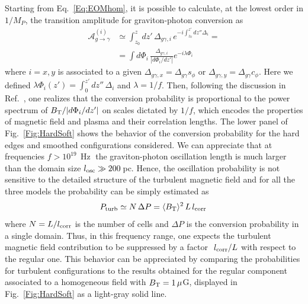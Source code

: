 \documentclass[twocolumn,superscriptaddress,floatfix,preprintnumbers, nofootinbib,hyperref]{revtex4-2}
\DeclareMathOperator{\Hz}{Hz}
\begin{document}
Starting from Eq.~\eqref{Eq:EOMhom}, it is possible to calculate, at the lowest order in $1/M_{P}$, the transition amplitude for graviton-photon conversion as~\cite{Marsh:2021ajy}
\begin{equation}
    \begin{split}
\mathcal{A}^{(i)}_{g\to\gamma}&\simeq \int_{z_{0}}^{z}dz'\, \Delta_{g\gamma,i}\,e^{-i\int_{z_{0}}^{z'} dz''\Delta_{i}}=\\
&=\int d\Phi_{i}\, \frac{\Delta_{g\gamma,i}}{|d\Phi_{i}/dz'|}e^{-i\lambda \Phi_{i}}
\end{split}
\end{equation}
where $i=x,y$ is associated to a given $\Delta_{g\gamma,x}=\Delta_{g\gamma}s_{\phi}$ or $\Delta_{g\gamma,y}=\Delta_{g\gamma}c_{\phi}$. Here we defined $\lambda\Phi_{i}(z')=\int_{0}^{z'}dz''\,\Delta_{i}$ and $\lambda=1/f$. Then, following the discussion in Ref.~\cite{Marsh:2021ajy}, one realizes that the conversion probability is proportional to the power spectrum of $B_{\rm T}/|d\Phi_{i}/dz'|$ on scales dictated by $1/f$, which encodes the properties of magnetic field and plasma and their correlation lengths. The lower panel of Fig.~\ref{Fig:HardSoft} shows the behavior of the conversion probability for the hard edges and smoothed configurations considered. We can appreciate that at frequencies $f>10^{19}\,\Hz$ the graviton-photon oscillation length is much larger than the domain size $l_{\rm osc}\gg 200\,$pc. Hence, the oscillation probability is not sensitive to the detailed structure of the turbulent magnetic field and for all the three models the probability can be simply estimated as~\cite{Carenza:2021alz}
\begin{equation}
    P_{\rm turb}\simeq N\,\Delta P=\langle B_{\rm T}\rangle^2\,L\,l_{\rm corr}\,
\end{equation}
where $N=L/l_{\rm corr}$ is the number of cells and $\Delta P$ is the conversion probability in a single domain. Thus, in this frequency range, one expects the turbulent magnetic field contribution to be suppressed by a factor $~l_{\rm corr}/L$ with respect to the regular one. This behavior can be appreciated by comparing the probabilities for turbulent configurations to the results obtained for the regular component associated to a homogeneous field with $B_{\rm T}=1\,\mu$G, displayed in Fig.~\ref{Fig:HardSoft} as a light-gray solid line.
\end{document}
